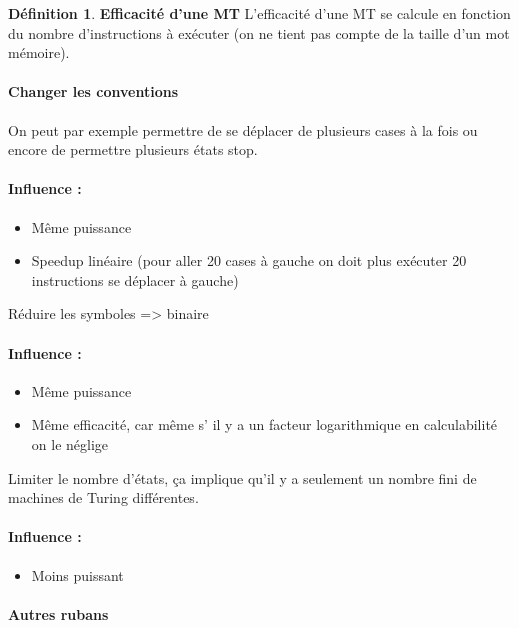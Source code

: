 \documentclass[11pt,a4paper]{article}
\theoremstyle{definition}
\newtheorem{mydef}{Définition}
\begin{document}
\begin{mydef}
	\textbf{Efficacité d'une MT} L'efficacité d'une MT se calcule en 
	fonction du nombre d'instructions à exécuter (on ne tient pas compte de 
	la taille d'un mot mémoire).
\end{mydef}

\paragraph{Changer les conventions}
On peut par exemple permettre de se déplacer de plusieurs cases à la fois ou 
encore de permettre plusieurs états stop.

\paragraph{Influence :} 
\begin{itemize}
	\item Même puissance
	\item Speedup linéaire (pour aller 20 cases à gauche on doit plus 
		exécuter 20 instructions se déplacer à gauche)
\end{itemize}

Réduire les symboles => binaire

\paragraph{Influence :} 
\begin{itemize}
	\item Même puissance
	\item Même efficacité, car même s’ il y a un facteur logarithmique en 
		calculabilité on le néglige
\end{itemize}

Limiter le nombre d'états, ça implique qu'il y a seulement un nombre fini de 
machines de Turing différentes.

\paragraph{Influence :} 
\begin{itemize}
	\item Moins puissant
\end{itemize}

\paragraph{Autres rubans}
\end{document}
